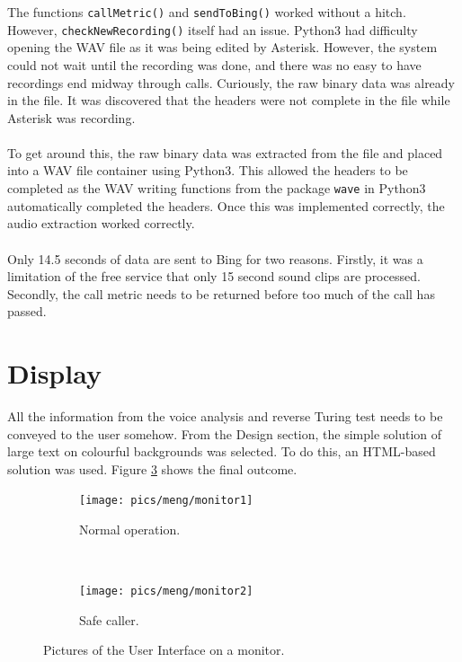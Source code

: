 \documentclass[main.tex]{subfiles}
\begin{document}
The functions \texttt{callMetric()} and \texttt{sendToBing()} worked without a hitch. However, \texttt{checkNewRecording()} itself had an issue. Python3 had difficulty opening the WAV file as it was being edited by Asterisk. However, the system could not wait until the recording was done, and there was no easy to have recordings end midway through calls. Curiously, the raw binary data was already in the file. It was discovered that the headers were not complete in the file while Asterisk was recording.
\\\\
To get around this, the raw binary data was extracted from the file and placed into a WAV file container using Python3. This allowed the headers to be completed as the WAV writing functions from the package \texttt{wave} in Python3 automatically completed the headers. Once this was implemented correctly, the audio extraction worked correctly.
\\\\
Only 14.5 seconds of data are sent to Bing for two reasons. Firstly, it was a limitation of the free service that only 15 second sound clips are processed. Secondly, the call metric needs to be returned before too much of the call has passed.

\section{Display}
All the information from the voice analysis and reverse Turing test needs to be conveyed to the user somehow. From the Design section, the simple solution of large text on colourful backgrounds was selected. To do this, an HTML-based solution was used. Figure \ref{fig:displays} shows the final outcome.

\begin{figure}[H]
	\captionsetup[subfigure]{position=b}
        \centering
        \begin{subfigure}{0.47\textwidth}
                \texttt{[image: pics/meng/monitor1]}
                \caption{Normal operation.}
                \label{fig:display1}
        \end{subfigure}
        ~
		\begin{subfigure}{0.47\textwidth}
                \texttt{[image: pics/meng/monitor2]}
                \caption{Safe caller.}
                \label{fig:display2}
        \end{subfigure}
	\caption{Pictures of the User Interface on a monitor.}
	\label{fig:displays}
\end{figure}
\end{document}
